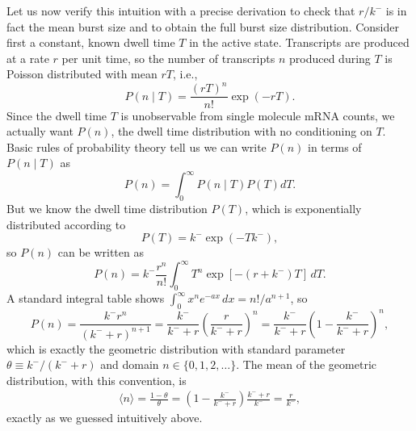 Let us now verify this intuition with a precise derivation to check that $r/k^-$
is in fact the mean burst size and to obtain the full burst size distribution.
Consider first a constant, known dwell time $T$ in the active state. Transcripts
are produced at a rate $r$ per unit time, so the number of transcripts $n$
produced during $T$ is Poisson distributed with mean $rT$, i.e.,
\begin{equation}
    P(n\mid T) = \frac{(rT)^n}{n!} \exp(-rT).
\end{equation}
Since the dwell time $T$ is unobservable from single molecule mRNA counts, we
actually want $P(n)$, the dwell time distribution with no conditioning on $T$.
Basic rules of probability theory tell us we can write $P(n)$ in terms of
$P(n\mid T)$ as
\begin{equation}
    P(n) =\int_0^\infty P(n\mid T) P(T) dT.
\end{equation}
But we know the dwell time distribution $P(T)$, which is exponentially
distributed according to
\begin{equation}
    P(T) = k^- \exp(-T k^-),
\end{equation}
so $P(n)$ can be written as
\begin{equation}
    P(n) = k^- \frac{r^n}{n!}
            \int_0^\infty T^n\exp[-(r + k^-)T]\,dT.
\end{equation}
A standard integral table shows $\int_0^\infty x^n e^{-ax}\,dx = n!/a^{n+1}$, so
\begin{equation}
    P(n) = \frac{k^- r^n}{(k^- + r)^{n+1}}
        = \frac{k^-}{k^- + r}
            \left(\frac{r}{k^- + r}\right)^n
        = \frac{k^-}{k^- + r}
            \left(1 - \frac{k^-}{k^- + r}\right)^n,
\end{equation}
which is exactly the geometric distribution with standard parameter
$\theta\equiv k^-/(k^- + r)$ and domain $n \in \{0, 1, 2, \dots\}$.
The mean of the geometric distribution, with this convention, is
\begin{align}
\langle n\rangle = \frac{1 - \theta}{\theta}
        = \left(1 - \frac{k^-}{k^- + r}\right)
                    \frac{k^- + r}{k^-}
        = \frac{r}{k^-},
\end{align}
exactly as we guessed intuitively above.

